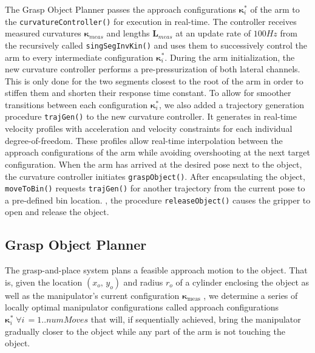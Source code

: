 The Grasp Object Planner passes the approach configurations $\boldsymbol{\kappa}_i^*$ of the arm to the \texttt{curvatureController()} for execution in real-time.
The controller receives measured curvatures $\boldsymbol{\kappa}_{meas}$ and lengths $\boldsymbol{L}_{meas}$ at an update rate of $100\unit{Hz}$ from the recursively called \texttt{singSegInvKin()} and uses them to successively control the arm to every intermediate configuration $\boldsymbol{\kappa}_i^*$.
During the arm initialization, the new curvature controller performs a pre-pressurization of both lateral channels. 
This is only done for the two segments closest to the root of the arm in order to stiffen them and shorten their response time constant.  
To allow for smoother transitions between each configuration $\boldsymbol{\kappa}_i^*$, we also added a trajectory generation procedure \texttt{trajGen()} to the new curvature controller. It generates in real-time velocity profiles with acceleration and velocity constraints for each individual degree-of-freedom.
These profiles allow real-time interpolation between the approach configurations of the arm while avoiding overshooting at the next target configuration.
When the arm has arrived at the desired pose next to the object, the curvature controller initiates \texttt{graspObject()}.
After encapsulating the object, \texttt{moveToBin()} requests \texttt{trajGen()} for another trajectory from the current pose to a pre-defined bin location.
, the procedure \texttt{releaseObject()} causes the gripper to open and release the object.

\subsection{Grasp Object Planner}
\label{subsec:grasp_planner}
The grasp-and-place system plans a feasible approach motion to the object.
That is, given the location $\left(x_o, \, y_o\right)$ and radius $r_o$ of a cylinder enclosing the object as well as the manipulator's current configuration $\boldsymbol{\kappa}_{\textrm{meas}}$ , we determine a series of locally optimal manipulator configurations called approach configurations $\boldsymbol{\kappa}_i^* \; \forall i \, = 1.. numMoves$ that will, if sequentially achieved, bring the manipulator gradually closer to the object while any part of the arm is not touching the object.

